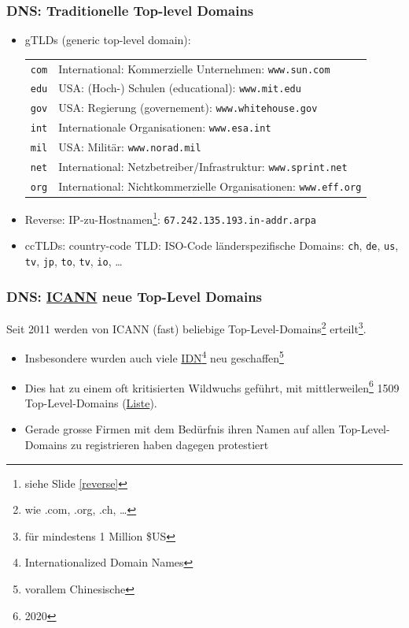 \documentclass[ignorenonframetext]{beamer}
\begin{document}
\begin{frame}
\frametitle{DNS: Traditionelle Top-level Domains}
\begin{itemize}
	\item{gTLDs (generic top-level domain):\\ \begin{tabular}{rl}
	\texttt{com} & International: Kommerzielle Unternehmen: \texttt{www.sun.com} \\
	\texttt{edu} & USA: (Hoch-) Schulen (educational): \texttt{www.mit.edu} \\
	\texttt{gov} & USA: Regierung (governement): \texttt{www.whitehouse.gov} \\
	\texttt{int} & Internationale Organisationen: \texttt{www.esa.int} \\
	\texttt{mil} & USA: Milit\"ar: \texttt{www.norad.mil} \\
	\texttt{net} & International: Netzbetreiber/Infrastruktur: \texttt{www.sprint.net} \\
	\texttt{org} & International: Nichtkommerzielle Organisationen: \texttt{www.eff.org} \\
	\end{tabular}}
	\item{Reverse: IP-zu-Hostnamen\footnote{siehe Slide \ref{reverse}}: \texttt{67.242.135.193.in-addr.arpa}}
  \item{ccTLDs: country-code TLD: ISO-Code l\"anderspezifische Domains: \texttt{ch}, \texttt{de}, \texttt{us}, \texttt{tv}, \texttt{jp}, \texttt{to}, \texttt{tv}, \texttt{io}, \ldots}
\end{itemize}
\end{frame}

\begin{frame}\label{icann}
\frametitle{DNS: \href{https://www.icann.org/}{ICANN} neue Top-Level Domains}
Seit 2011 werden von ICANN (fast) beliebige Top-Level-Domains\footnote{wie .com, .org, .ch, \ldots} erteilt\footnote{f\"ur mindestens 1 Million \$US}.

\begin{itemize}
  \item Insbesondere wurden auch viele \href{https://en.wikipedia.org/wiki/Internationalized_domain_name}{IDN}\footnote{Internationalized Domain Names} neu geschaffen\footnote{vorallem Chinesische}
  \item Dies hat zu einem oft kritisierten Wildwuchs gef\"uhrt, mit mittlerweilen\footnote{2020}
1509 Top-Level-Domains (\href{https://data.iana.org/TLD/tlds-alpha-by-domain.txt}{Liste}).
  \item Gerade grosse Firmen mit dem Bed\"urfnis ihren Namen auf allen Top-Level-Domains
zu registrieren haben dagegen protestiert
\end{itemize}
\end{frame}
\end{document}
